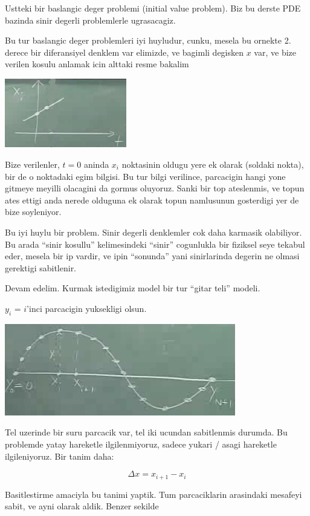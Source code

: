 \documentclass[12pt,fleqn]{article}
\begin{document}
Ustteki bir baslangic deger problemi (initial value problem). Biz bu derste
PDE bazinda sinir degerli problemlerle ugrasacagiz. 

Bu tur baslangic deger problemleri iyi huyludur, cunku, mesela bu ornekte
2. derece bir diferansiyel denklem var elimizde, ve bagimli degisken $x$
var, ve bize verilen kosulu anlamak icin alttaki resme bakalim


\includegraphics[height=3cm]{1_06.png}

Bize verilenler, $t=0$ aninda $x_i$ noktasinin oldugu yere ek olarak
(soldaki nokta), bir de o noktadaki egim bilgisi. Bu tur bilgi verilince,
parcacigin hangi yone gitmeye meyilli olacagini da gormus oluyoruz. Sanki
bir top ateslenmis, ve topun ates ettigi anda nerede olduguna ek olarak
topun namlusunun gosterdigi yer de bize soyleniyor.

Bu iyi huylu bir problem. Sinir degerli denklemler cok daha karmasik
olabiliyor. Bu arada ``sinir kosullu'' kelimesindeki ``sinir'' cogunlukla
bir fiziksel seye tekabul eder, mesela bir ip vardir, ve ipin ``sonunda''
yani sinirlarinda degerin ne olmasi gerektigi sabitlenir. 

Devam edelim. Kurmak istedigimiz model bir tur ``gitar teli'' modeli. 

$y_i$ = $i$'inci parcacigin yuksekligi olsun. 

\includegraphics[height=4cm]{1_07.png}

Tel uzerinde bir suru parcacik var, tel iki ucundan sabitlenmis durumda. Bu
problemde yatay hareketle ilgilenmiyoruz, sadece yukari / asagi hareketle
ilgileniyoruz. Bir tanim daha:

\[ \Delta x = x_{i+1} - x_i  \]

Basitlestirme amaciyla bu tanimi yaptik. Tum parcaciklarin arasindaki
mesafeyi sabit, ve ayni olarak aldik. Benzer sekilde
\end{document}
